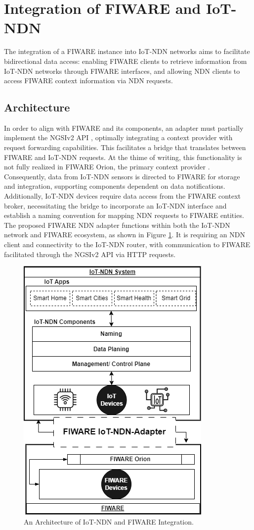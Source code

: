 \documentclass[conference]{IEEEtran}
\begin{document}
\section{Integration of FIWARE and IoT-NDN}
The integration of a FIWARE instance into IoT-NDN networks aims to facilitate bidirectional data access:
enabling FIWARE clients to retrieve information from IoT-NDN networks through FIWARE interfaces, and allowing NDN clients to access FIWARE context information via NDN requests.

\subsection{Architecture}
In order to align with FIWARE and its components, an adapter must partially implement the NGSIv2 API \cite[FIWARE developers]{b3}, optimally integrating a context provider with request forwarding capabilities.
This facilitates a bridge that translates between FIWARE and IoT-NDN requests.
At the thime of writing, this functionality is not fully realized in FIWARE Orion, the primary context provider \cite[FIWARE Orion]{b4}.
Consequently, data from IoT-NDN sensors is directed to FIWARE for storage and integration, supporting components dependent on data notifications.
Additionally, IoT-NDN devices require data access from the FIWARE context broker, necessitating the bridge to incorporate an IoT-NDN interface and establish a naming convention for mapping NDN requests to FIWARE entities.
The proposed FIWARE NDN adapter functions within both the IoT-NDN network and FIWARE ecosystem, as shown in Figure \ref{iot-ndn-fiware}.
It is requiring an NDN client and connectivity to the IoT-NDN router, with communication to FIWARE facilitated through the NGSIv2 API via HTTP requests.

\begin{figure}[htbp]
    \centerline{\includegraphics[scale=.4]{graph_draft.png}}
    \caption{ An Architecture of IoT-NDN and FIWARE Integration.}
    \label{iot-ndn-fiware}
\end{figure}
\end{document}
